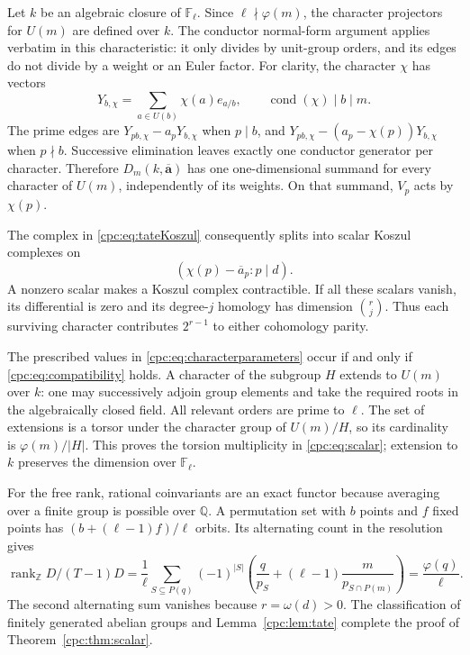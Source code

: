 Let $k$ be an algebraic closure of $\mathbb F_\ell$. Since
$\ell\nmid\varphi(m)$, the character projectors for $U(m)$ are
defined over $k$. The conductor normal-form argument applies
verbatim in this characteristic: it only divides by unit-group
orders, and its edges do not divide by a weight or an Euler factor.
For clarity, the character $\chi$ has vectors
\[
 Y_{b,\chi}=\sum_{a\in U(b)}\chi(a)e_{a/b},
 \qquad \operatorname{cond}(\chi)\mid b\mid m.
\]
The prime edges are
$Y_{pb,\chi}-a_pY_{b,\chi}$ when $p\mid b$, and
$Y_{pb,\chi}-(a_p-\chi(p))Y_{b,\chi}$ when $p\nmid b$.
Successive elimination leaves exactly one conductor generator per
character. Therefore $D_m(k,\overline{\mathbf a})$ has one
one-dimensional summand for every character of $U(m)$, independently
of its weights. On that summand, $V_p$ acts by $\chi(p)$.

The complex in \eqref{cpc:eq:tateKoszul} consequently splits into
scalar Koszul complexes on
\begin{equation}\label{cpc:eq:characterparameters}
 (\chi(p)-\overline a_p:p\mid d).
\end{equation}
A nonzero scalar makes a Koszul complex contractible. If all these
scalars vanish, its differential is zero and its degree-$j$
homology has dimension $\binom rj$. Thus each surviving character
contributes $2^{r-1}$ to either cohomology parity.

The prescribed values in \eqref{cpc:eq:characterparameters} occur
if and only if \eqref{cpc:eq:compatibility} holds. A character of
the subgroup $H$ extends to $U(m)$ over $k$: one may successively
adjoin group elements and take the required roots in the algebraically
closed field. All relevant orders are prime to $\ell$. The set of
extensions is a torsor under the character group of $U(m)/H$, so
its cardinality is $\varphi(m)/|H|$. This proves the torsion
multiplicity in \eqref{cpc:eq:scalar}; extension to $k$ preserves
the dimension over $\mathbb F_\ell$.

For the free rank, rational coinvariants are an exact functor because
averaging over a finite group is possible over $\mathbb Q$. A
permutation set with $b$ points and $f$ fixed points has
$(b+(\ell-1)f)/\ell$ orbits. Its alternating count in the resolution
gives
\[
 \operatorname{rank}_{\mathbb Z}D/(T-1)D
 =\frac1\ell\sum_{S\subseteq P(q)}(-1)^{|S|}
 \left(\frac q{p_S}+(\ell-1)
           \frac m{p_{S\cap P(m)}}\right)
 =\frac{\varphi(q)}\ell.
\]
The second alternating sum vanishes because $r=\omega(d)>0$.
The classification of finitely generated abelian groups and
Lemma~\ref{cpc:lem:tate} complete the proof of
Theorem~\ref{cpc:thm:scalar}.

